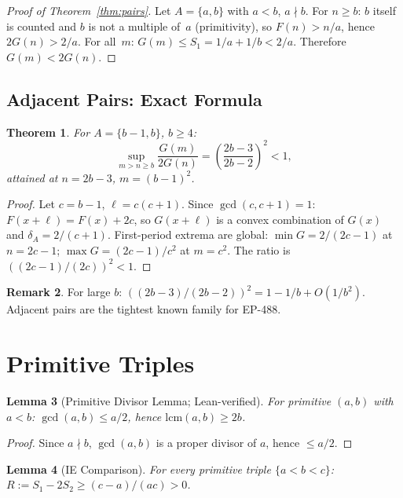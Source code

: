 \documentclass[11pt,a4paper]{article}
\newtheorem{theorem}{Theorem}[section]
\newtheorem{lemma}[theorem]{Lemma}
\theoremstyle{definition}
\newtheorem{remark}[theorem]{Remark}
\begin{document}
\begin{proof}[Proof of Theorem~\ref{thm:pairs}]
Let $A = \{a, b\}$ with $a < b$, $a \nmid b$. For $n \geq b$:
$b$ itself is counted and $b$ is not a multiple of~$a$ (primitivity),
so $F(n) > n/a$, hence $2G(n) > 2/a$. For all~$m$:
$G(m) \leq S_1 = 1/a + 1/b < 2/a$. Therefore $G(m) < 2G(n)$.
\end{proof}

\subsection{Adjacent Pairs: Exact Formula}

\begin{theorem}\label{thm:adjacent}
For $A = \{b{-}1, b\}$, $b \geq 4$:
\[
\sup_{m>n \geq b} \frac{G(m)}{2G(n)}
= \left(\frac{2b{-}3}{2b{-}2}\right)^2 < 1,
\]
attained at $n = 2b{-}3$, $m = (b{-}1)^2$.
\end{theorem}

\begin{proof}
Let $c = b{-}1$, $\ell = c(c{+}1)$. Since $\gcd(c,c{+}1) = 1$:
$F(x{+}\ell) = F(x) + 2c$, so $G(x{+}\ell)$ is a convex combination
of $G(x)$ and $\delta_A = 2/(c{+}1)$. First-period extrema are global:
$\min G = 2/(2c{-}1)$ at $n = 2c{-}1$; $\max G = (2c{-}1)/c^2$ at
$m = c^2$. The ratio is $((2c{-}1)/(2c))^2 < 1$.
\end{proof}

\begin{remark}
For large $b$: $((2b{-}3)/(2b{-}2))^2 = 1 - 1/b + O(1/b^2)$.
Adjacent pairs are the tightest known family for EP-488.
\end{remark}

\section{Primitive Triples}

\begin{lemma}[Primitive Divisor Lemma; Lean-verified]\label{lem:pdl}
For primitive $(a,b)$ with $a < b$: $\gcd(a,b) \leq a/2$, hence
$\mathrm{lcm}(a,b) \geq 2b$.
\end{lemma}

\begin{proof}
Since $a \nmid b$, $\gcd(a,b)$ is a proper divisor of $a$, hence
$\leq a/2$.
\end{proof}

\begin{lemma}[IE Comparison]\label{lem:ie}
For every primitive triple $\{a < b < c\}$:
$R := S_1 - 2S_2 \geq (c{-}a)/(ac) > 0$.
\end{lemma}
\end{document}
